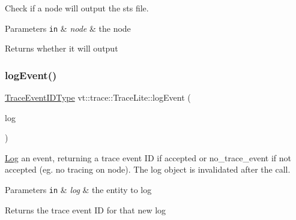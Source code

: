 Check if a node will output the sts file. 


\begin{DoxyParams}[1]{Parameters}
\mbox{\tt in}  & {\em node} & the node\\
\hline
\end{DoxyParams}
\begin{DoxyReturn}{Returns}
whether it will output 
\end{DoxyReturn}
\mbox{\label{structvt_1_1trace_1_1_trace_lite_aeb468f1222761674e4ffb0cfa27f0641}} 
\subsubsection{\texorpdfstring{log\+Event()}{logEvent()}}
{\footnotesize\ttfamily \hyperlink{namespacevt_1_1trace_a64a7185f3e102df8d8258f263ccd1582}{Trace\+Event\+I\+D\+Type} vt\+::trace\+::\+Trace\+Lite\+::log\+Event (\begin{DoxyParamCaption}\item[{\hyperlink{structvt_1_1trace_1_1_trace_lite_aeb73e523d31829d3163c877b145afa2a}{Log\+Type} \&\&}]{log }\end{DoxyParamCaption})\hspace{0.3cm}{\ttfamily [protected]}}



\hyperlink{structvt_1_1trace_1_1_log}{Log} an event, returning a trace event ID if accepted or {\ttfamily no\+\_\+trace\+\_\+event} if not accepted (eg. no tracing on node). The log object is invalidated after the call. 


\begin{DoxyParams}[1]{Parameters}
\mbox{\tt in}  & {\em log} & the entity to log\\
\hline
\end{DoxyParams}
\begin{DoxyReturn}{Returns}
the trace event ID for that new log 
\end{DoxyReturn}
\mbox{\label{structvt_1_1trace_1_1_trace_lite_a7b60eedbf68a4989a1566f2cf85d94dd}} 

